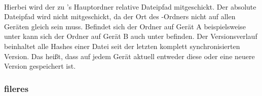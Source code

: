 	\begin{rightwordgroup}{\isprotomsgtype}
	\end{rightwordgroup} \\
	
	\begin{rightwordgroup}{\isprotomsgdata}
		 \\
		\skippedwords \\
		 \\
		 \\
		\skippedwords \\
	\end{rightwordgroup}

\begin{description} 
		Hierbei wird der zu \sblit's Hauptordner relative Dateipfad mitgeschickt. Der absolute Dateipfad wird nicht mitgeschickt, da der Ort des \sblit-Ordners nicht auf allen Geräten gleich sein muss. Befindet sich der Ordner auf Gerät A beispielsweise unter  kann sich der Ordner auf Gerät B auch unter  befinden.
		Der Versionsverlauf beinhaltet alle Hashes einer Datei seit der letzten komplett synchronisierten Version. Das heißt, dass auf jedem Gerät aktuell entweder diese oder eine neuere Version gespeichert ist.
\end{description}

		
\subsubsection{\gls{fileres}} \label{fileres}

\messagestart
	 \\
	
	\begin{rightwordgroup}{\isprotomsgtype}
	\end{rightwordgroup} \\
	
	\begin{rightwordgroup}{\isprotomsgdata}
		 \\
		 \\
		\skippedwords \\
		 \\
		 \\
		\skippedwords \\
	\end{rightwordgroup}

